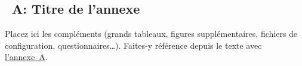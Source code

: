 \chapter*{\appendicesname}
{}
\markboth{\appendicesname}{\appendicesname}
\thispagestyle{plain}

\setcounter{figure}{0}
\setcounter{table}{0}
\setcounter{lstlisting}{0}
\renewcommand{\thefigure}{A.\arabic{figure}}
\renewcommand{\thetable}{A.\arabic{table}}
\renewcommand{\thelstlisting}{A.\arabic{lstlisting}}

\section*{\appendixname~A: Titre de l'annexe}
\label{app:a}

Placez ici les compléments (grands tableaux, figures supplémentaires,
fichiers de configuration, questionnaires\dots). Faites-y référence depuis
le texte avec \hyperref[app:a]{l'annexe~A}.

\newpage
